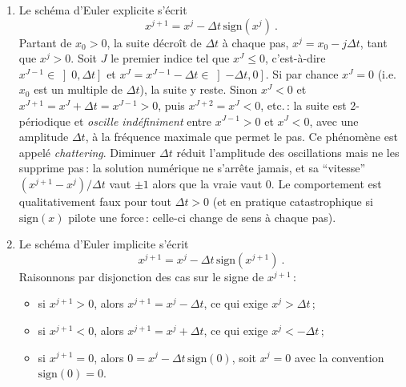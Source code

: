\begin{enumerate}
  Ceci est impossible pour \(f\) continûment différentiable (ou
  seulement localement Lipschitzienne)\,: le théorème de
  Cauchy-Lipschitz garantit alors l'unicité des solutions, y compris en
  temps rétrograde. Si une solution atteignait l'équilibre \(x^*\) en un
  temps \(t^*\), elle coïnciderait, par unicité de la solution passant par
  \((t^*,x^*)\), avec la solution stationnaire \(x\equiv x^*\), donc on
  aurait \(x(0)=x^*\). La convergence en temps fini est un phénomène
  propre aux dynamiques non Lipschitziennes.
\item
  Le schéma d'Euler explicite s'écrit \[
  x^{j+1} = x^j - {\Delta t}\, \mathrm{sign}(x^j) \ .
  \] Partant de \(x_0>0\), la suite décroît de \({\Delta t}\) à chaque
  pas, \(x^j = x_0 - j{\Delta t}\), tant que \(x^j>0\). Soit \(J\) le
  premier indice tel que \(x^J\leq 0\), c'est-à-dire \(x^{J-1}\in \left]0,{\Delta t}\right]\)
  et \(x^J = x^{J-1}-{\Delta t}\in\left]-{\Delta t},0\right]\). Si par
  chance \(x^J=0\) (i.e. \(x_0\) est un multiple de \({\Delta t}\)), la
  suite y reste. Sinon \(x^J<0\) et \(x^{J+1} = x^J + {\Delta t} = x^{J-1}>0\),
  puis \(x^{J+2} = x^J<0\), etc.\,: la suite est \(2\)-périodique et
  \emph{oscille indéfiniment} entre \(x^{J-1}>0\) et \(x^J<0\), avec une
  amplitude \({\Delta t}\), à la fréquence maximale que permet le pas. Ce
  phénomène est appelé \emph{chattering}. Diminuer \({\Delta t}\) réduit
  l'amplitude des oscillations mais ne les supprime pas\,: la solution
  numérique ne s'arrête jamais, et sa ``vitesse'' \((x^{j+1}-x^j)/{\Delta t}\)
  vaut \(\pm 1\) alors que la vraie vaut 0. Le comportement
  est qualitativement faux pour tout \({\Delta t}>0\) (et en pratique
  catastrophique si \(\mathrm{sign}(x)\) pilote une force\,: celle-ci
  change de sens à chaque pas).
\item
  Le schéma d'Euler implicite s'écrit \[
  x^{j+1} = x^j - {\Delta t}\, \mathrm{sign}(x^{j+1}) \ .
  \] Raisonnons par disjonction des cas sur le signe de \(x^{j+1}\)\,:

  \begin{itemize}
  \tightlist
  \item
    si \(x^{j+1}>0\), alors \(x^{j+1} = x^j - {\Delta t}\), ce qui exige
    \(x^j>{\Delta t}\)\,;
  \item
    si \(x^{j+1}<0\), alors \(x^{j+1} = x^j + {\Delta t}\), ce qui exige
    \(x^j<-{\Delta t}\)\,;
  \item
    si \(x^{j+1}=0\), alors \(0 = x^j - {\Delta t}\,\mathrm{sign}(0)\),
    soit \(x^j = 0\) avec la convention \(\mathrm{sign}(0)=0\).
  \end{itemize}


\end{enumerate}
